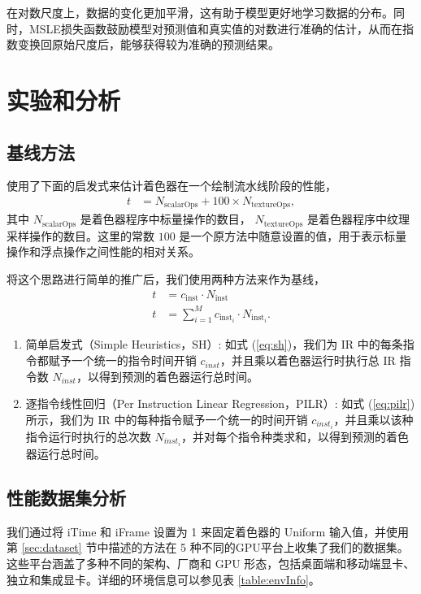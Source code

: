 在对数尺度上，数据的变化更加平滑，这有助于模型更好地学习数据的分布。同时，MSLE损失函数鼓励模型对预测值和真实值的对数进行准确的估计，从而在指数变换回原始尺度后，能够获得较为准确的预测结果。

\section{实验和分析}

\subsection{基线方法}

\citet{10.1145/2816795.2818104} 使用了下面的启发式来估计着色器在一个绘制流水线阶段的性能，
\begin{align}
t &= N_\text{scalarOps} + 100 \times N_\text{textureOps},
\end{align}
其中 $N_\text{scalarOps}$ 是着色器程序中标量操作的数目， $N_\text{textureOps}$ 是着色器程序中纹理采样操作的数目。这里的常数 $100$ 是一个原方法中随意设置的值，用于表示标量操作和浮点操作之间性能的相对关系。

将这个思路进行简单的推广后，我们使用两种方法来作为基线，
\begin{align}
\label{eq:sh} t &= c_\text{inst} \cdot N_\text{inst} \\
\label{eq:pilr} t &= \sum_{i=1}^{M} c_{\text{inst}_{i}} \cdot N_{\text{inst}_{i}}.
\end{align}

\begin{enumerate}
    \item 简单启发式（Simple Heuristics，SH）: 如式 (\ref{eq:sh})，我们为 IR 中的每条指令都赋予一个统一的指令时间开销 $c_{inst}$，并且乘以着色器运行时执行总 IR 指令数 $N_{inst}$，以得到预测的着色器运行总时间。
    \item 逐指令线性回归（Per Instruction Linear Regression，PILR）: 如式 (\ref{eq:pilr}) 所示，我们为 IR 中的每种指令赋予一个统一的时间开销 $c_{inst_i}$，并且乘以该种指令运行时执行的总次数 $N_{inst_i}$，并对每个指令种类求和，以得到预测的着色器运行总时间。
\end{enumerate}


\subsection{性能数据集分析}

我们通过将 iTime 和 iFrame 设置为 1 来固定着色器的 Uniform 输入值，并使用第 \ref{sec:dataset} 节中描述的方法在 5 种不同的GPU平台上收集了我们的数据集。这些平台涵盖了多种不同的架构、厂商和 GPU 形态，包括桌面端和移动端显卡、独立和集成显卡。详细的环境信息可以参见表 \ref{table:envInfo}。

